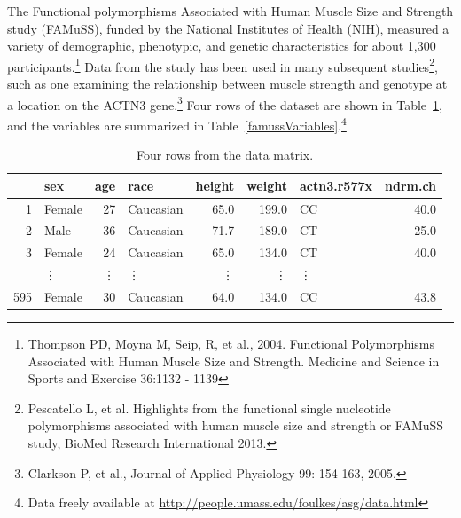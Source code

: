 \begin{doublespace}
The Functional polymorphisms Associated with Human Muscle Size and Strength study (FAMuSS), funded by the National Institutes of Health (NIH), measured a variety of demographic, phenotypic, and genetic characteristics for about 1,300 participants.\footnote{Thompson PD, Moyna M, Seip, R, et al., 2004.  Functional Polymorphisms Associated with Human Muscle Size and Strength.  Medicine and Science in Sports and Exercise 36:1132 - 1139} Data from the study has been used in many subsequent studies\footnote{Pescatello L, et al. Highlights from the functional single nucleotide polymorphisms associated with human muscle size and strength or FAMuSS study, BioMed Research International 2013.}, such as one examining the relationship between muscle strength and genotype at a location on the ACTN3 gene.\footnote{Clarkson P, et al., Journal of Applied Physiology 99: 154-163, 2005.} Four rows of the  dataset are shown in Table~\ref{famussDF}, and the variables are summarized in Table~\ref{famussVariables}.\footnote{Data freely available at \url{http://people.umass.edu/foulkes/asg/data.html}}

\begin{table}[ht]
	\centering
	\begin{tabular}{rlrlrrlr}
		\hline
		& sex & age & race & height & weight & actn3.r577x & ndrm.ch \\ 
		\hline
		1 & Female & 27 & Caucasian & 65.0 & 199.0 & CC & 40.0 \\ 
		2 & Male & 36 & Caucasian & 71.7 & 189.0 & CT & 25.0 \\ 
		3 & Female & 24 & Caucasian & 65.0 & 134.0 & CT & 40.0 \\ 
       & \vdots & \vdots  & \vdots & \vdots & \vdots & \vdots \\
		595 & Female & 30 & Caucasian & 64.0 & 134.0 & CC & 43.8 \\ 
		\hline
	\end{tabular}
	
	
	\caption{Four rows from the  data matrix.}
	\label{famussDF}
\end{table}




\end{doublespace}
